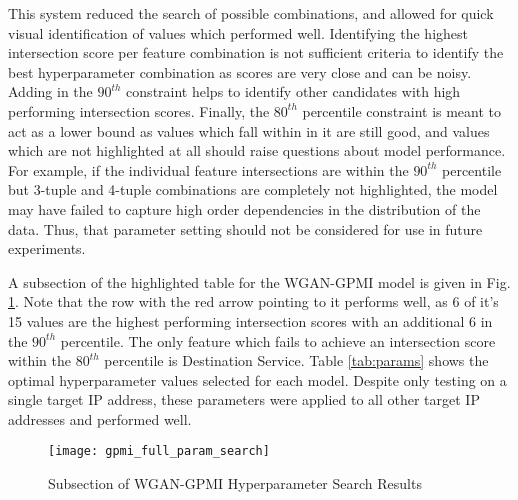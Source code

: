 This system reduced the search of possible combinations, and allowed for quick visual identification of values which performed well. Identifying the highest intersection score per feature combination is not sufficient criteria to identify the best hyperparameter combination as scores are very close and can be noisy. Adding in the $90^{th}$ constraint helps to identify other candidates with high performing intersection scores. Finally, the $80^{th}$ percentile constraint is meant to act as a lower bound as values which fall within in it are still good, and values which are not highlighted at all should raise questions about model performance. For example, if the individual feature intersections are within the $90^{th}$ percentile but 3-tuple and 4-tuple combinations are completely not highlighted, the model may have failed to capture high order dependencies in the distribution of the data. Thus, that parameter setting should not be considered for use in future experiments.

A subsection of the highlighted table for the WGAN-GPMI model is given in Fig. \ref{fig:highlighted_param_gpmi}. Note that the row with the red arrow pointing to it performs well, as 6 of it's 15 values are the highest performing intersection scores with an additional 6 in the $90^{th}$ percentile. The only feature which fails to achieve an intersection score within the $80^{th}$ percentile is Destination Service. Table \ref{tab:params} shows the optimal hyperparameter values selected for each model. Despite only testing on a single target IP address, these parameters were applied to all other target IP addresses and performed well.

\begin{figure}[!htbp]
	\centering
	\texttt{[image: gpmi\_full\_param\_search]}
	\caption{
		Subsection of WGAN-GPMI Hyperparameter Search Results
	}
	\label{fig:highlighted_param_gpmi}
\end{figure}

